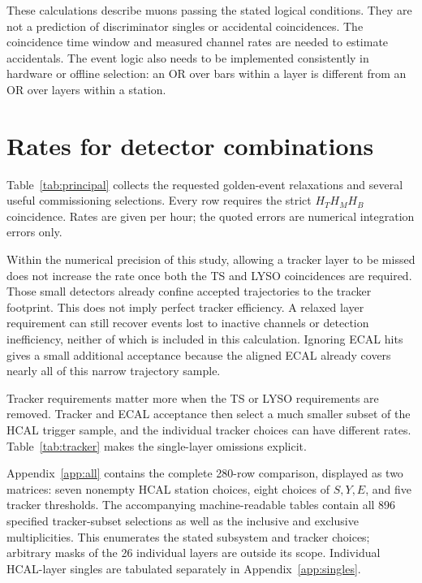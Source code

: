 These calculations describe muons passing the stated logical conditions.
They are not a prediction of discriminator singles or accidental coincidences.
The coincidence time window and measured channel rates are needed to estimate
accidentals. The event logic also needs to be implemented consistently in
hardware or offline selection: an OR over bars within a layer is different
from an OR over layers within a station.

\section{Rates for detector combinations}
\label{sec:combinations}
Table~\ref{tab:principal} collects the requested golden-event relaxations and
several useful commissioning selections. Every row requires the strict
$H_T H_M H_B$ coincidence. Rates are given per hour; the quoted errors are
numerical integration errors only.



Within the numerical precision of this study, allowing a tracker layer to be
missed does not increase the rate once both the TS and LYSO coincidences are required. Those
small detectors already confine accepted trajectories to the tracker footprint.
This does not imply perfect tracker efficiency. A relaxed layer requirement
can still recover events lost to inactive channels or detection inefficiency,
neither of which is included in this calculation. Ignoring ECAL hits gives a
small additional acceptance because the aligned ECAL already covers nearly
all of this narrow trajectory sample.

Tracker requirements matter more when the TS or LYSO requirements are
removed. Tracker and ECAL acceptance then select a much smaller subset of
the HCAL trigger sample, and the individual tracker choices can have different
rates. Table~\ref{tab:tracker} makes the single-layer omissions explicit.





Appendix~\ref{app:all} contains the complete 280-row comparison, displayed as
two matrices: seven nonempty HCAL station choices, eight choices of $S,Y,E$,
and five tracker thresholds. The accompanying machine-readable tables contain
all 896 specified tracker-subset selections as well as the inclusive and
exclusive multiplicities. This enumerates the stated subsystem and tracker
choices; arbitrary masks of the 26 individual layers are outside its scope. Individual
HCAL-layer singles are tabulated separately in Appendix~\ref{app:singles}.

